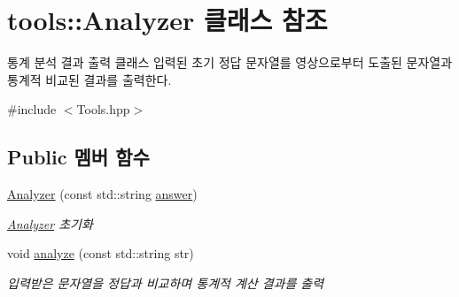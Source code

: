 \hypertarget{classtools_1_1_analyzer}{}\section{tools\+:\+:Analyzer 클래스 참조}
\label{classtools_1_1_analyzer}


통계 분석 결과 출력 클래스 입력된 초기 정답 문자열를 영상으로부터 도출된 문자열과 통계적 비교된 결과를 출력한다.  




{\ttfamily \#include $<$Tools.\+hpp$>$}

\subsection*{Public 멤버 함수}
\begin{DoxyCompactItemize}
\item 
\hyperlink{classtools_1_1_analyzer_a6510bc1e10d40e671db16b7a91fc8fac}{Analyzer} (const std\+::string \hyperlink{classtools_1_1_analyzer_a266409271441e355f817ffe0ffd59250}{answer})
\begin{DoxyCompactList}\small\item\em \hyperlink{classtools_1_1_analyzer}{Analyzer} 초기화 \end{DoxyCompactList}\item 
void \hyperlink{classtools_1_1_analyzer_abd1e57e10b843dca874e933236363efa}{analyze} (const std\+::string str)
\begin{DoxyCompactList}\small\item\em 입력받은 문자열을 정답과 비교하며 통계적 계산 결과를 출력 \end{DoxyCompactList}\end{DoxyCompactItemize}
